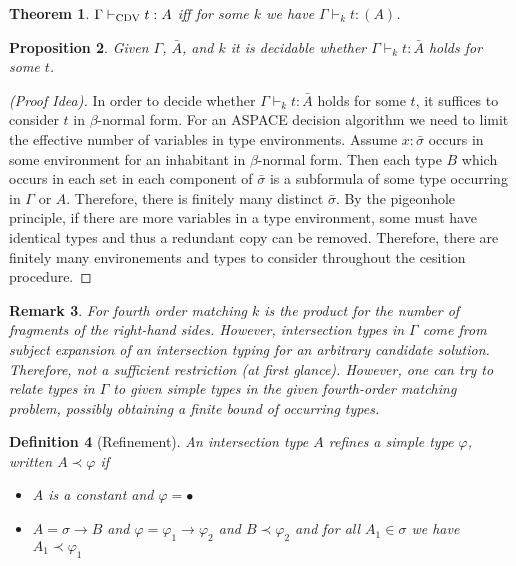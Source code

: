 \documentclass[10pt,a4paper]{article}
\theoremstyle{plain}%
\newtheorem{theorem}{Theorem}
\newtheorem{definition}[theorem]{Definition}
\newtheorem{proposition}[theorem]{Proposition}
\newtheorem{remark}[theorem]{Remark}
\begin{document}
\begin{theorem}
$\Gamma \vdash_{\textnormal{CDV}} t : A$ iff for some $k$ we have $\Gamma \vdash_k t : (A)$.
\end{theorem}

\begin{proposition}
Given $\Gamma$, $\bar{A}$, and $k$ it is decidable whether $\Gamma \vdash_k t : \bar{A}$ holds for some $t$.
\end{proposition}

\begin{proof}[(Proof Idea)]
In order to decide whether $\Gamma \vdash_k t : \bar{A}$ holds for some $t$, it suffices to consider $t$ in $\beta$-normal form.
For an \textsf{ASPACE} decision algorithm we need to limit the effective number of variables in type environments.
Assume $x : \bar{\sigma}$ occurs in some environment for an inhabitant in $\beta$-normal form.
Then each type $B$ which occurs in each set in each component of $\bar{\sigma}$ is a subformula of some type occurring in $\Gamma$ or $A$.
Therefore, there is finitely many distinct $\bar{\sigma}$.
By the pigeonhole principle, if there are more variables in a type environment, some must have identical types and thus a redundant copy can be removed.
Therefore, there are finitely many environements and types to consider throughout the cesition procedure.
\end{proof}

\begin{remark}
For fourth order matching $k$ is the product for the number of fragments of the right-hand sides.
However, intersection types in $\Gamma$ come from subject expansion of an intersection typing for an arbitrary candidate solution.
Therefore, not a sufficient restriction (at first glance).
However, one can try to relate types in $\Gamma$ to given simple types in the given fourth-order matching problem, possibly obtaining a finite bound of occurring types.
\end{remark}

\begin{definition}[Refinement]
An intersection type $A$ refines a simple type $\varphi$, written $A \prec \varphi$ if
\begin{itemize}
\item $A$ is a constant and $\varphi = \bullet$
\item $A = \sigma \to B$ and $\varphi = \varphi_1 \to \varphi_2$ and $B \prec \varphi_2$ and for all $A_1 \in \sigma$ we have $A_1 \prec \varphi_1$ 
\end{itemize}
\end{definition}
\end{document}
